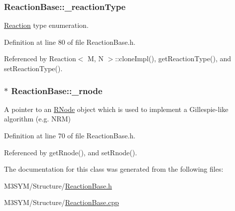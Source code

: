 \hypertarget{classReactionBase_a367c9de5f4d7d589d846c0201e9ca273}{
\subsubsection[{\+\_\+reaction\+Type}]{ Reaction\+Base\+::\+\_\+reaction\+Type\hspace{0.3cm}{\ttfamily [protected]}}}\label{classReactionBase_a367c9de5f4d7d589d846c0201e9ca273}


\hyperlink{classReaction}{Reaction} type enumeration. 



Definition at line 80 of file Reaction\+Base.\+h.



Referenced by Reaction$<$ M, N $>$\+::clone\+Impl(), get\+Reaction\+Type(), and set\+Reaction\+Type().

\hypertarget{classReactionBase_aa402747434b46dbea69b94928140b3a2}{
\subsubsection[{\+\_\+rnode}]{$\ast$ Reaction\+Base\+::\+\_\+rnode\hspace{0.3cm}{\ttfamily [protected]}}}\label{classReactionBase_aa402747434b46dbea69b94928140b3a2}


A pointer to an \hyperlink{classRNode}{R\+Node} object which is used to implement a Gillespie-\/like algorithm (e.\+g. N\+R\+M) 



Definition at line 70 of file Reaction\+Base.\+h.



Referenced by get\+Rnode(), and set\+Rnode().



The documentation for this class was generated from the following files\+:\begin{DoxyCompactItemize}
\item 
M3\+S\+Y\+M/\+Structure/\hyperlink{ReactionBase_8h}{Reaction\+Base.\+h}\item 
M3\+S\+Y\+M/\+Structure/\hyperlink{ReactionBase_8cpp}{Reaction\+Base.\+cpp}\end{DoxyCompactItemize}
